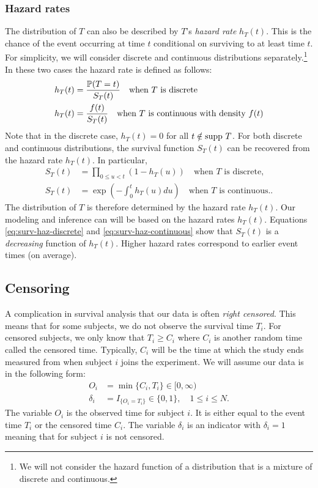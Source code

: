 \subsubsection*{Hazard rates}
The distribution of $T$ can also be described by $T$'s \emph{hazard rate} $h_T(t)$. This is the chance of the event occurring at time $t$ conditional on surviving to at least time $t$. For simplicity, we will consider discrete and continuous distributions separately.\footnote{We will not consider the hazard function of a distribution that is a mixture of discrete and continuous.}  In these two cases the hazard rate is defined as follows:
\begin{align}
    h_T(t)&=\frac{{\mathbb P}(T = t)}{S_T(t)} \quad \text{when $T$ is discrete}\label{eq:hazard-discrete}\\
    h_T(t)&= \frac{f(t)}{S_T(t)} \quad \text{when $T$ is continuous with density $f(t)$}\label{eq:hazard-continuous}
\end{align}
Note that in the discrete case, $h_T(t)=0$ for all $t \notin {\text{supp} \ } T$. For both discrete and continuous distributions, the survival function $S_T(t)$ can be recovered from the hazard rate $h_T(t)$. In particular,
\begin{align}
    S_T(t)&=\prod_{0 \le u < t}(1-h_T(u)) \quad \text{when $T$ is discrete},\label{eq:surv-haz-discrete}\\
    S_T(t)&=\exp\left(-\int_0^t h_T(u)du\right) \quad \text{when $T$ is continuous}.\label{eq:surv-haz-continuous}.
\end{align}
The distribution of $T$ is therefore determined by the hazard rate $h_T(t)$. Our modeling and inference can will be based on the hazard rates $h_T(t)$. Equations \eqref{eq:surv-haz-discrete} and \eqref{eq:surv-haz-continuous} show that $S_T(t)$ is a \emph{decreasing} function of $h_T(t)$. Higher hazard rates correspond to earlier event times (on average).

\subsection{Censoring}

A complication in survival analysis that our data is often \emph{right censored}. This means that for some subjects, we do not observe the survival time $T_i$. For censored subjects, we only know that $T_i \ge C_i$ where $C_i$ is another random time called the censored time. Typically, $C_i$ will be the time at which the study ends measured from when subject $i$ joins the experiment. We will assume our data is in the following form:
\begin{align}
    O_i &= \min\{C_i,T_i\} \in [0,\infty) \nonumber \\
    \delta_i &=I_{\{O_i = T_i\}} \in\{0,1\}, \quad 1 \le i \le N.\label{eq:surv-model1}
\end{align}
The variable $O_i$ is the observed time for subject $i$. It is either equal to the event time $T_i$ or the censored time $C_i$. The variable $\delta_i$ is an indicator with $\delta_i=1$ meaning that for subject $i$ is not censored.

